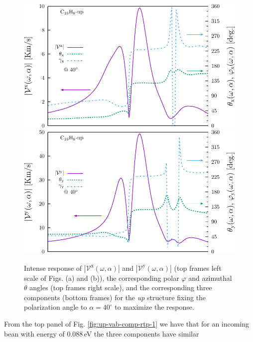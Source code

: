 \documentclass[prb,11pt,tightenlines,twocolumn,aps]{revtex4-1}
\begin{document}
\begin{figure}[t]
    \centering
    \includegraphics[width=\linewidth]{upplots/up-vxb-rtp-m2}
    \\
    \includegraphics[width=\linewidth]{upplots/up-vyb-rtp-m2}
    
    \caption{Intense response of
    $|\mathcal{V}^{\mathrm{x}}(\omega,\alpha)|$ and
    $|\mathcal{V}^{\mathrm{y}}(\omega,\alpha)|$ (top frames left scale of Figs.
    (a) and (b)), the corresponding polar $\varphi$ and azimuthal $\theta$
    angles (top frames right scale), and the corresponding three components
    (bottom frames) for the \emph{up} structure fixing the polarization angle
    to $\alpha=40^{\circ}$ to maximize the response.}

    \label{fig:up-vab-comp-rtp-2}
\end{figure}
From the top panel of Fig. \ref{fig:up-vab-comp-rtp-1} we have that for an
incoming bean with energy of 0.088\,eV the three components have similar
\end{document}
